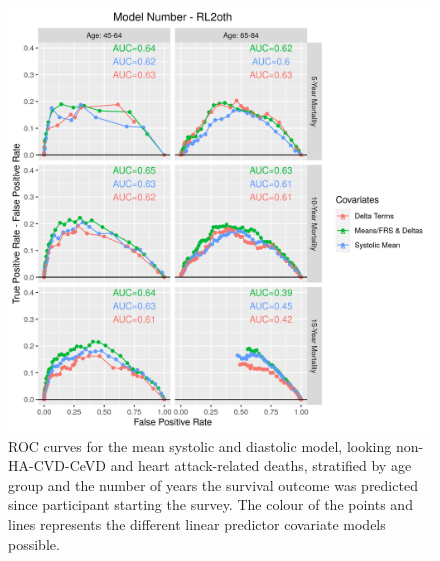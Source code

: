 \documentclass[
]{article}
\begin{document}
\begin{figure}
\hypertarget{fig:ROC_RL2oth}{%
\centering
\includegraphics{./Rmarkdown_Plots/ROC_CAx-Covariates_EventType_RL2oth.png}
\caption{ROC curves for the mean systolic and diastolic model, looking non-HA-CVD-CeVD and heart attack-related deaths, stratified by age group and the number of years the survival outcome was predicted since participant starting the survey. The colour of the points and lines represents the different linear predictor covariate models possible.}\label{fig:ROC_RL2oth}
}
\end{figure}
\end{document}
